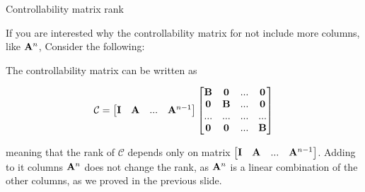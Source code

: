 \documentclass{beamer}
\begin{document}
\begin{frame}{Controllability matrix rank}
	\begin{flushleft}
		
		If you are interested why the controllability matrix for not include more columns, like $\mathbf{A}^n$, Consider the following: 
		
		The controllability matrix can be written as 
		
		\begin{equation}
			\mathcal{C} = \begin{bmatrix}
				\mathbf{I} &
				\mathbf{A}  & ... &
				\mathbf{A}^{n - 1} 
			\end{bmatrix}
			\begin{bmatrix}
				\mathbf{B} & \mathbf{0} & ... & \mathbf{0} \\
				\mathbf{0}  & \mathbf{B} & ... & \mathbf{0} \\
				...  & ... & ... & ... \\
				\mathbf{0}  & \mathbf{0} & ... & \mathbf{B} 
			\end{bmatrix}
		\end{equation}
		
		meaning that the rank of $\mathcal{C}$ depends only on matrix $\begin{bmatrix}
			\mathbf{I} &
			\mathbf{A}  & ... &
			\mathbf{A}^{n - 1} 
		\end{bmatrix}$. Adding  to it columns $\mathbf{A}^n$ does not change the rank, as $\mathbf{A}^n$ is a linear combination of the other columns, as we proved in the previous slide.
		
	\end{flushleft}
\end{frame}
\end{document}
